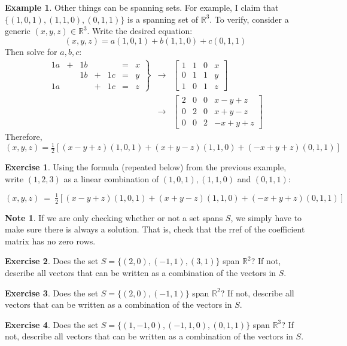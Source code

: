 \documentclass{beamer}
\newcommand{\R}{\mathbb{R}}
\newcommand{\fn}{\insertframenumber}
\theoremstyle{definition}
\newtheorem{exercise}{Exercise}
\newtheorem*{exa}{Example}
\newtheorem*{nb}{Note}
\begin{document}
\begin{frame}{\fn}
	\begin{exa}
		Other things can be spanning sets.  For example, I claim that $\{(1,0,1),(1,1,0),(0,1,1)\}$ is a spanning set of $\R^3$.  To verify, consider a generic $(x,y,z)\in\R^3$.  Write the desired equation:
			\[(x,y,z)=a(1,0,1)+b(1,1,0)+c(0,1,1)\]
		Then solve for $a,b,c$:
			$$\begin{array}{rcl}\left.\begin{array}{rcrcrcl}
				1a&+&1b&&&=&x\\
				&&1b&+&1c&=&y\\
				1a&&&+&1c&=&z
			\end{array}\right\}&\rightarrow&
			\begin{bmatrix}1&1&0&x\\0&1&1&y\\1&0&1&z\end{bmatrix}
			\\&\rightarrow&
			\begin{bmatrix}
				2 & 0 & 0 & x - y + z \\
				0 & 2 & 0 & x + y - z \\
				0 & 0 & 2 & -x + y + z
			\end{bmatrix}
			\end{array}$$
		Therefore, $(x,y,z)=\frac{1}{2}\left[(x-y+z)(1,0,1)+(x+y-z)(1,1,0)+(-x+y+z)(0,1,1)\right]$
	\end{exa}
\end{frame}
\begin{frame}{\fn}
	\begin{exercise}
		Using the formula (repeated below) from the previous example, write $(1,2,3)$ as a linear combination of $(1,0,1),(1,1,0)$ and $(0,1,1)$:
		
		 {\footnotesize $ (x,y,z)~=~\frac{1}{2}\left[(x-y+z)(1,0,1)+(x+y-z)(1,1,0)+(-x+y+z)(0,1,1)\right]$}
	\end{exercise}
	\begin{nb}
		If we are only checking whether or not a set spans $S$, we simply have to make sure there is always a solution.  That is, check that the rref of the coefficient matrix has no zero rows.
	\end{nb}
\end{frame}
\begin{frame}{\fn}
	\begin{exercise}
		Does the set $S=\{(2,0),(-1,1),(3,1)\}$ span $\R^2$?  If not, describe all vectors that can be written as a combination of the vectors in $S$.
	\end{exercise}
	\begin{exercise}
		Does the set $S=\{(2,0),(-1,1)\}$ span $\R^2$? If not, describe all vectors that can be written as a combination of the vectors in $S$.
	\end{exercise}
	\begin{exercise}
	Does the set $S=\{(1,-1,0),(-1,1,0),(0,1,1)\}$ span $\R^3$? If not, describe all vectors that can be written as a combination of the vectors in $S$.
	\end{exercise}
\end{frame}
\end{document}
